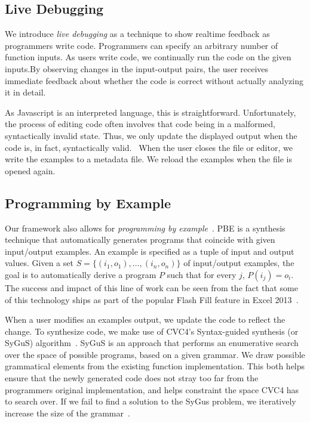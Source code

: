 \subsection{Live Debugging}
We introduce \textit{live debugging} as a technique to show realtime feedback as programmers write code.
Programmers can specify an arbitrary number of function inputs.
As users write code, we continually run the code on the given inputs.By observing changes in the input-output pairs,
the user receives immediate feedback about whether the code is correct without actually analyzing it in detail.

As Javascript is an interpreted language, this is straightforward.
Unfortunately, the process of editing code often involves that code
being in a malformed, syntactically invalid state.
Thus, we only update the displayed output when the code is, in fact,
syntactically valid.~
When the user closes the file or editor,
we write the examples to a metadata file.
We reload the examples when the file is opened again.

\subsection{Programming by Example}
Our framework also allows for \textit{programming by example}~\cite{cypher93,lieberman01,synasc12}.
PBE  is a synthesis technique that automatically generates programs that coincide with given input/output examples. An example is specified as a tuple of input and output values. Given a set $S= \{(i_1, o_1),\ldots, (i_n, o_n)\}$ of input/output examples, the goal is to automatically derive a program $P$ such that for every $j$, $P(i_j) = o_i$. The success and impact of this line of work can be seen from the fact that some of this technology ships as part of the popular Flash Fill feature in Excel 2013~\cite{flashFillPOPL}.

When a user modifies an examples output, we update the code to reflect the change.
To synthesize code, we make use of CVC4's Syntax-guided synthesis (or SyGuS) algorithm~\cite{reynolds2017sygus}.
SyGuS is an approach that performs an enumerative search over the space of possible programs,
based on a given grammar.
We draw possible grammatical elements from the existing function implementation.
This both helps ensure that the newly generated code does not stray too far from the programmers original implementation,
and helps constraint the space CVC4 has to search over.
If we fail to find a solution to the SyGus problem, we iteratively increase the size of the grammar~.

